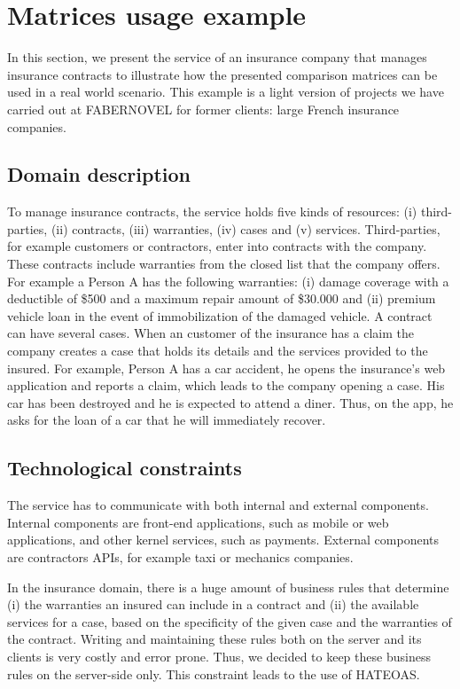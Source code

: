 \section{Matrices usage example}

\vspace*{-0.2cm}


In this section, we present the service of an insurance company that manages insurance contracts to illustrate how the presented comparison matrices can be used in a real world scenario. This example is a light version of projects we have carried out at FABERNOVEL for former clients: large French insurance companies.

\subsection{Domain description}

To manage insurance contracts, the service holds five kinds of resources: (i) third-parties, (ii) contracts, (iii) warranties, (iv) cases and (v) services. Third-parties, for example customers or contractors, enter into contracts with the company. These contracts include warranties from the closed list that the company offers. For example a Person A has the following warranties: (i) damage coverage with a deductible of \$500 and a maximum repair amount of \$30.000 and (ii) premium vehicle loan in the event of immobilization of the damaged vehicle. A contract can have several cases. When an customer of the insurance has a claim the company creates a case that holds its details and the services provided to the insured. For example, Person A has a car accident, he opens the insurance's web application and reports a claim, which leads to the company opening a case. His car has been destroyed and he is expected to attend a diner. Thus, on the app, he asks for the loan of a car that he will immediately recover.

\subsection{Technological constraints}

The service has to communicate with both internal and external components. Internal components are front-end applications, such as mobile or web applications, and other kernel services, such as payments. External components are contractors APIs, for example taxi or mechanics companies.

In the insurance domain, there is a huge amount of business rules that determine (i) the warranties an insured can include in a contract and (ii) the available services for a case, based on the specificity of the given case and the warranties of the contract. Writing and maintaining these rules both on the server and its clients is very costly and error prone. Thus, we decided to keep these business rules on the server-side only. This constraint leads to the use of HATEOAS.

